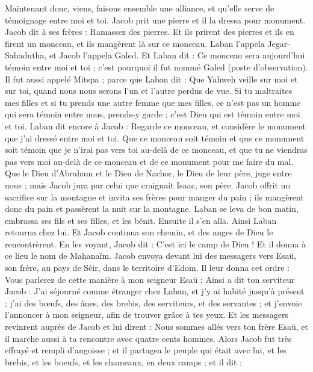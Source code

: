 \begin{multicols}{2}
Maintenant donc, viens, faisons ensemble une alliance, et qu’elle serve de témoignage entre moi et toi.
Jacob prit une pierre et il la dressa pour monument.
Jacob dit à ses frères : Ramassez des pierres. Et ils prirent des pierres et ils en firent un monceau, et ils mangèrent là sur ce monceau.
Laban l'appela Jegar-Sahadutha, et Jacob l'appela Galed.
Et Laban dit : Ce monceau sera aujourd'hui témoin entre moi et toi ; c'est pourquoi il fut nommé Galed (poste d’observation).
Il fut aussi appelé Mitspa ; parce que Laban dit : Que Yahweh veille sur moi et sur toi, quand nous nous serons l'un et l'autre perdus de vue.
Si tu maltraites mes filles et si tu prends une autre femme que mes filles, ce n’est pas un homme qui sera témoin entre nous, prends-y garde ; c'est Dieu qui est témoin entre moi et toi.
Laban dit encore à Jacob : Regarde ce monceau, et considère le monument que j'ai dressé entre moi et toi.
Que ce monceau soit témoin et que ce monument soit témoin que je n’irai pas vers toi au-delà de ce monceau, et que tu ne viendras pas vers moi au-delà de ce monceau et de ce monument pour me faire du mal.
Que le Dieu d'Abraham et le Dieu de Nachor, le Dieu de leur père, juge entre nous ; mais Jacob jura par celui que craignait Isaac, son père.
Jacob offrit un sacrifice sur la montagne et invita ses frères pour manger du pain ; ils mangèrent donc du pain et passèrent la nuit sur la montagne.
Laban se leva de bon matin, embrassa ses fils et ses filles, et les bénit. Ensuite il s'en alla. Ainsi Laban retourna chez lui.
\VerseOne{}Et Jacob continua son chemin, et des anges de Dieu le rencontrèrent.
En les voyant, Jacob dit : C'est ici le camp de Dieu ! Et il donna à ce lieu le nom de Mahanaïm.
Jacob envoya devant lui des messagers vers Esaü, son frère, au pays de Séir, dans le territoire d'Edom.
Il leur donna cet ordre : Vous parlerez de cette manière à mon seigneur Esaü : Ainsi a dit ton serviteur Jacob : J'ai séjourné comme étranger chez Laban, et j’y ai habité jusqu'à présent ;
j’ai des bœufs, des ânes, des brebis, des serviteurs, et des servantes ; et j'envoie l’annoncer à mon seigneur, afin de trouver grâce à  tes yeux.
Et les messagers revinrent auprès de Jacob et lui dirent : Nous sommes allés vers ton frère Esaü, et il marche aussi à ta rencontre avec quatre cents hommes.
Alors Jacob fut très effrayé et rempli d’angoisse ; et il partagea le peuple qui était avec lui, et les brebis, et les boeufs, et les chameaux, en deux camps ; et  il dit :

\end{multicols}
